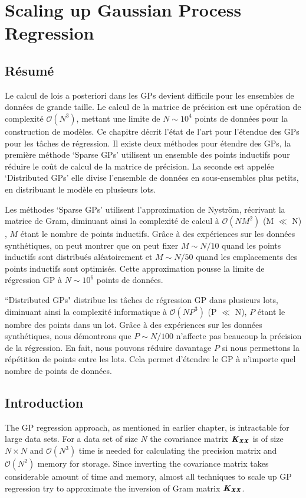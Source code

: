 \chapter{Scaling up Gaussian Process Regression}
\label{chapScalingGPR}


\begin{mdframed}[hidealllines=true,backgroundcolor=lightgray!20]
\section*{Résumé}
Le calcul de lois a posteriori dans les GPs devient difficile pour les ensembles de données de grande taille. Le calcul de la matrice de précision est une opération de complexité $ \mathcal{O}(N ^ {3}) $, mettant une limite de $ N \sim 10^4 $ points de données pour la construction de modèles. Ce chapitre décrit l'état de l'art pour l'étendue des GPs pour les tâches de régression. Il existe deux méthodes pour étendre des GPs, la première méthode `Sparse GPs' utilisent un ensemble des points inductifs pour réduire le coût de calcul de la matrice de précision. La seconde est appelée `Distributed GPs' elle divise l'ensemble de données en sous-ensembles plus petits, en distribuant le modèle en plusieurs lots.

Les méthodes `Sparse GPs' utilisent l'approximation de Nystr\"{o}m, récrivant la matrice de Gram, diminuant ainsi la complexité de calcul à $ \mathcal{O} (NM^{2}) $ (M $ \ll $ N) , $ M $ étant le nombre de points inductifs. Grâce à des expériences sur les données synthétiques, on peut montrer que on peut fixer $ M \sim N/10 $ quand les points inductifs sont distribués aléatoirement et $ M \sim N/50 $ quand les emplacements des points inductifs sont optimisés. Cette approximation pousse la limite de régression GP à $ N \sim 10^6 $ points de données.

``Distributed GPs" distribue les tâches de régression GP dans plusieurs lots, diminuant ainsi la complexité informatique à $ \mathcal{O} (NP^{3}) $ (P $\ll$ N), $ P $ étant le nombre des points dans un lot. Grâce à des expériences sur les données synthétiques, nous démontrons que $ P \sim N/100 $ n'affecte pas beaucoup la précision de la régression. En fait, nous pouvons réduire davantage $ P $ si nous permettons la répétition de points entre les lots. Cela permet d'étendre le GP à n'importe quel nombre de points de données.
\end{mdframed}



\section{Introduction}
The GP regression approach, as mentioned in earlier chapter, is intractable for large data sets. For a data set of size $N$ the covariance matrix $\bm{\mathit{K_{XX}}}$ is of size $N \times N$ and $\mathcal{O}\left ( N^{3} \right )$ time is needed for calculating the precision matrix and $\mathcal{O}\left ( N^{2} \right )$ memory for storage. Since inverting the covariance matrix takes considerable amount of time and memory, almost all techniques to scale up GP regression try to approximate the inversion of Gram matrix $\bm{\mathit{K_{XX}}}$. 

